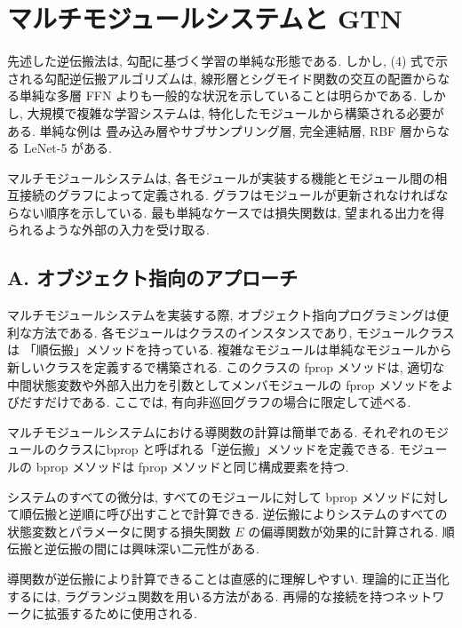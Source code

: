 \documentclass[twocolumn]{jarticle}     %
\begin{document}
\section{マルチモジュールシステムと GTN}
先述した逆伝搬法は, 勾配に基づく学習の単純な形態である.
しかし, (4) 式で示される勾配逆伝搬アルゴリズムは, 
線形層とシグモイド関数の交互の配置からなる単純な多層 FFN よりも一般的な状況を示していることは明らかである.
しかし, 大規模で複雑な学習システムは, 特化したモジュールから構築される必要がある. 
単純な例は 畳み込み層やサブサンプリング層, 完全連結層, RBF 層からなる LeNet-5 がある.
\par
マルチモジュールシステムは, 各モジュールが実装する機能とモジュール間の相互接続のグラフによって定義される. グラフはモジュールが更新されなければならない順序を示している.
最も単純なケースでは損失関数は, 望まれる出力を得られるような外部の入力を受け取る.

\subsection*{A. オブジェクト指向のアプローチ}
マルチモジュールシステムを実装する際, オブジェクト指向プログラミングは便利な方法である. 各モジュールはクラスのインスタンスであり, モジュールクラスは 「順伝搬」メソッドを持っている. 複雑なモジュールは単純なモジュールから新しいクラスを定義するで構築される.
このクラスの fprop メソッドは, 適切な中間状態変数や外部入出力を引数としてメンバモジュールの fprop メソッドをよびだすだけである.
ここでは, 有向非巡回グラフの場合に限定して述べる.
\par
マルチモジュールシステムにおける導関数の計算は簡単である. それぞれのモジュールのクラスにbprop と呼ばれる「逆伝搬」メソッドを定義できる. 
モジュールの bprop メソッドは fprop メソッドと同じ構成要素を持つ.

システムのすべての微分は, すべてのモジュールに対して bprop メソッドに対して順伝搬と逆順に呼び出すことで計算できる.
逆伝搬によりシステムのすべての状態変数とパラメータに関する損失関数 $E$ の偏導関数が効果的に計算される.
順伝搬と逆伝搬の間には興味深い二元性がある.
\par
導関数が逆伝搬により計算できることは直感的に理解しやすい. 理論的に正当化するには, ラグランジュ関数を用いる方法がある.
再帰的な接続を持つネットワークに拡張するために使用される.
\end{document}
